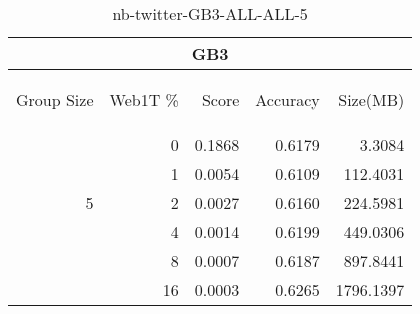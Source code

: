 \begin{center}
\begin{table}[htbp] 
 \begin{center}
\begin{tabular}{ | r | r | r | r | r |}
\hline
\multicolumn{5}{|c|}{GB3}\\
\hline
\begin{sideways}Group Size\end{sideways} & \begin{sideways}Web1T \%\end{sideways} & \begin{sideways}Score\end{sideways} & \begin{sideways}Accuracy\end{sideways} & \begin{sideways}Size(MB)\end{sideways}\\
\hline
\multirow{5}{*}{5}
 & 0 & 0.1868 & 0.6179 & 3.3084\\ \cline{2-5}
 & 1 & 0.0054 & 0.6109 & 112.4031\\ \cline{2-5}
 & 2 & 0.0027 & 0.6160 & 224.5981\\ \cline{2-5}
 & 4 & 0.0014 & 0.6199 & 449.0306\\ \cline{2-5}
 & 8 & 0.0007 & 0.6187 & 897.8441\\ \cline{2-5}
 & 16 & 0.0003 & 0.6265 & 1796.1397\\ \cline{2-5}
\hline
\end{tabular}
\caption{nb-twitter-GB3-ALL-ALL-5}
\label{table:nb-twitter-GB3-ALL-ALL-5}
\end{center}
 \end{table}
\end{center}


